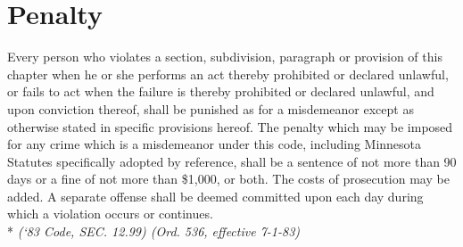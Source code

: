 \setcounter{section}{98}
\section{Penalty}
Every person who violates a section, subdivision, paragraph or provision of this chapter when he or she performs an act thereby prohibited or declared unlawful, or fails to act when the failure is thereby prohibited or declared unlawful, and upon conviction thereof, shall be punished as for a misdemeanor except as otherwise stated in specific provisions hereof. The penalty which may be imposed for any crime which is a misdemeanor under this code, including Minnesota Statutes specifically adopted by reference, shall be a sentence of not more than 90 days or a fine of not more than \$1,000, or both. The costs of prosecution may be added. A separate offense shall be deemed committed upon each day during which a violation occurs or continues.\\*
\emph{(‘83 Code, SEC. 12.99)  (Ord. 536, effective 7-1-83)}
